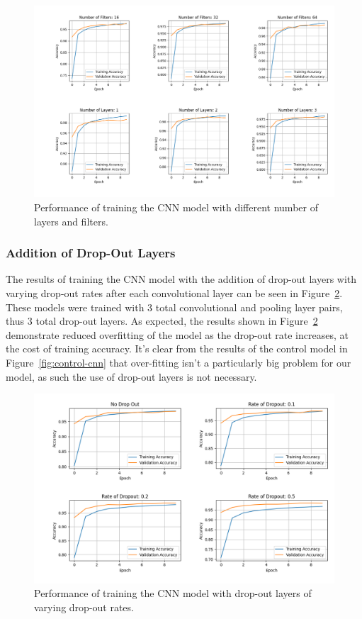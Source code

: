 \documentclass[a4paper]{article}
\begin{document}
\begin{figure}[h]
    \centering
    \includegraphics[scale=0.45]{images/n-layers-n-filters-cnn.png}
    \caption{Performance of training the CNN model with different number of layers and filters.}
    \label{fig:layers-filters}
\end{figure}

\subsubsection{Addition of Drop-Out Layers}

The results of training the CNN model with the addition of drop-out layers with varying drop-out rates after each convolutional layer can be seen in Figure~\ref{fig:drop-out}. These models were trained with 3 total convolutional and pooling layer pairs, thus 3 total drop-out layers. As expected, the results shown in Figure~\ref{fig:drop-out} demonstrate reduced overfitting of the model as the drop-out rate increases, at the cost of training accuracy. It's clear from the results of the control model in Figure~\ref{fig:control-cnn} that over-fitting isn't a particularly big problem for our model, as such the use of drop-out layers is not necessary. 

\begin{figure}[h]
    \centering
    \includegraphics[scale=0.5]{images/drop-out-cnn.png}
    \caption{Performance of training the CNN model with drop-out layers of varying drop-out rates.}
    \label{fig:drop-out}
\end{figure}
\end{document}
